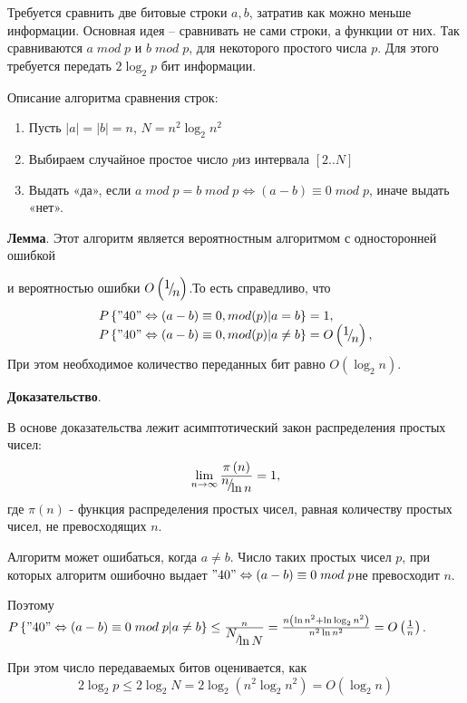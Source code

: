 \begin{problem}

Требуется сравнить две битовые строки $a,b$, затратив как можно меньше информации. Основная идея -- сравнивать не сами строки, а функции от них. Так сравниваются $a\; mod\; p$ и $b\; mod\; p$, для некоторого простого числа $p$. Для этого требуется передать $2\log _{2} p$ бит информации.

Описание алгоритма сравнения строк:

\begin{enumerate}
\item  Пусть $\left|a\right|=\left|b\right|=n$, $N=n^{2} \log _{2} n^{2} $

\item  Выбираем случайное простое число $p$из интервала $\left[2..N\right]$ 

\item  Выдать «да», если $a\; mod\; p=b\; mod\; p\Leftrightarrow (a-b)\equiv 0\; mod\; p$, иначе выдать «нет».
\end{enumerate}

\noindent \textbf{Лемма}. Этот алгоритм является вероятностным алгоритмом с односторонней ошибкой

\noindent и вероятностью ошибки $O\left({\raise0.7ex\hbox{$ 1 $}\!\mathord{\left/ {\vphantom {1 n}} \right. \kern-\nulldelimiterspace}\!\lower0.7ex\hbox{$ n $}} \right)$.То есть справедливо, что
\[\begin{array}{l} {P\left\{"40"\Leftrightarrow (a-b)\equiv 0,mod(p)|a=b\right\}=1,} \\ {P\left\{"40"\Leftrightarrow (a-b)\equiv 0,mod(p)|a\ne b\right\}=O\left({\raise0.7ex\hbox{$ 1 $}\!\mathord{\left/ {\vphantom {1 n}} \right. \kern-\nulldelimiterspace}\!\lower0.7ex\hbox{$ n $}} \right),} \end{array}\] 
 При этом необходимое количество переданных бит равно $O\left(\log _{2} n\right)$.

\textbf{Доказательство}.

В основе доказательства лежит асимптотический закон распределения простых чисел:
\[\mathop{\lim }\limits_{n\to \infty } \frac{\pi \left(n\right)}{{\raise0.7ex\hbox{$ n $}\!\mathord{\left/ {\vphantom {n \ln n}} \right. \kern-\nulldelimiterspace}\!\lower0.7ex\hbox{$ \ln n $}} } =1,\] 
где $\pi \left(n\right)$ - функция распределения простых чисел, равная количеству простых чисел, не превосходящих $n$.

Алгоритм может ошибаться, когда $a\ne b$. Число таких простых чисел $p$, при которых алгоритм ошибочно выдает $"40"\Leftrightarrow (a-b)\equiv 0\; mod\; p$не превосходит $n$. 

Поэтому $P\left\{"40"\Leftrightarrow (a-b)\equiv 0\; mod\; p|a\ne b\right\}\le \frac{n}{{\raise0.7ex\hbox{$ N $}\!\mathord{\left/ {\vphantom {N \ln N}} \right. \kern-\nulldelimiterspace}\!\lower0.7ex\hbox{$ \ln N $}} } =\frac{n\left(\ln n^{2} +\ln \log _{2} n^{2} \right)}{n^{2} \ln n^{2} } =O\left(\frac{1}{n} \right)$.

При этом число передаваемых битов оценивается, как
\[2\log _{2} p\le 2\log _{2} N=2\log _{2} \left(n^{2} \log _{2} n^{2} \right)=O\left(\log _{2} n\right)\] 

\end{problem}



